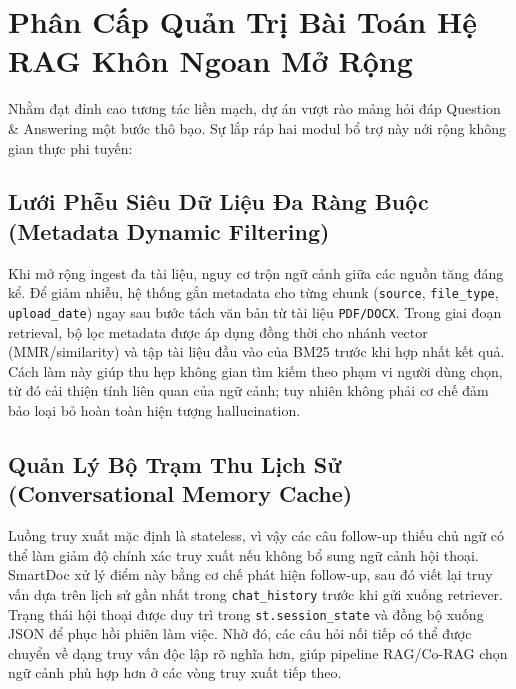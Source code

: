 \documentclass[10pt, conference, a4paper, compsocconf]{IEEEtran}
\begin{document}
\section{Phân Cấp Quản Trị Bài Toán Hệ RAG Khôn Ngoan Mở Rộng}

Nhằm đạt đỉnh cao tương tác liền mạch, dự án vượt rào mảng hỏi đáp Question \& Answering một bước thô bạo. Sự lắp ráp hai modul bổ trợ này nới rộng không gian thực phi tuyến:

\subsection{Lưới Phễu Siêu Dữ Liệu Đa Ràng Buộc (Metadata Dynamic Filtering)}
Khi mở rộng ingest đa tài liệu, nguy cơ trộn ngữ cảnh giữa các nguồn tăng đáng kể. Để giảm nhiễu, hệ thống gắn metadata cho từng chunk (\texttt{source}, \texttt{file\_type}, \texttt{upload\_date}) ngay sau bước tách văn bản từ tài liệu \texttt{PDF/DOCX}.
Trong giai đoạn retrieval, bộ lọc metadata được áp dụng đồng thời cho nhánh vector (MMR/similarity) và tập tài liệu đầu vào của BM25 trước khi hợp nhất kết quả. Cách làm này giúp thu hẹp không gian tìm kiếm theo phạm vi người dùng chọn, từ đó cải thiện tính liên quan của ngữ cảnh; tuy nhiên không phải cơ chế đảm bảo loại bỏ hoàn toàn hiện tượng hallucination.

\subsection{Quản Lý Bộ Trạm Thu Lịch Sử (Conversational Memory Cache)}
Luồng truy xuất mặc định là stateless, vì vậy các câu follow-up thiếu chủ ngữ có thể làm giảm độ chính xác truy xuất nếu không bổ sung ngữ cảnh hội thoại. SmartDoc xử lý điểm này bằng cơ chế phát hiện follow-up, sau đó viết lại truy vấn dựa trên lịch sử gần nhất trong \texttt{chat\_history} trước khi gửi xuống retriever.
Trạng thái hội thoại được duy trì trong \texttt{st.session\_state} và đồng bộ xuống JSON để phục hồi phiên làm việc. Nhờ đó, các câu hỏi nối tiếp có thể được chuyển về dạng truy vấn độc lập rõ nghĩa hơn, giúp pipeline RAG/Co-RAG chọn ngữ cảnh phù hợp hơn ở các vòng truy xuất tiếp theo.
\end{document}
